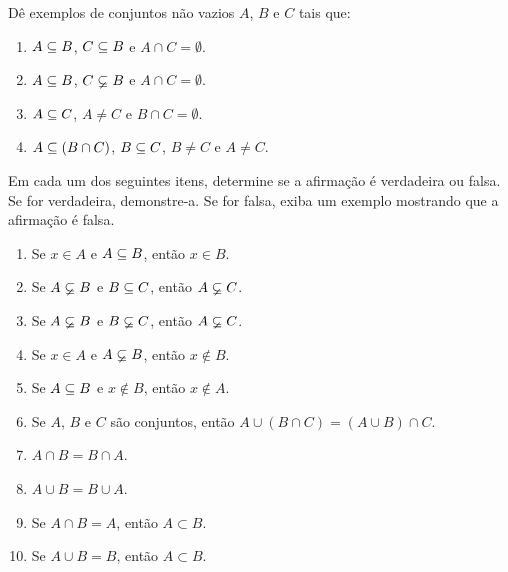 \documentclass[12pt]{exam}
\begin{document}
    \questao{} D\^e exemplos de conjuntos n\~ao vazios $A$, $B$ e $C$ tais que:
    \begin{enumerate}[label={\alph*})]
        \item $A \subseteq B$, $C \subseteq B$ e $A \cap C = \emptyset$.

        \item $A \subseteq B$, $C \varsubsetneq B$ e $A \cap C = \emptyset$.

        \item $A \subseteq C$, $A \ne C$ e $B \cap C = \emptyset$.

        \item $A \subseteq (B \cap C)$, $B \subseteq C$, $B \ne C$ e $A \ne C$.
    \end{enumerate}

    \vspace{.3cm}

    \questao{} Em cada um dos seguintes itens, determine se a afirma\c{c}\~ao \'e
    verdadeira ou falsa. Se for verdadeira, demonstre-a. Se for falsa, exiba um
    exemplo mostrando que a afirma\c{c}\~ao \'e falsa.
    \begin{enumerate}[label={\alph*})]
        \item Se $x \in A$ e $A \subseteq B$, ent\~ao $x \in B$.

        \item Se $A \varsubsetneq B$ e $B \subseteq C$, ent\~ao $A \varsubsetneq C$.

        \item Se $A \varsubsetneq B$ e $B \varsubsetneq C$, ent\~ao $A \varsubsetneq C$.

        \item Se $x \in A$ e $A \varsubsetneq B$, ent\~ao $x \notin B$.

        \item Se $A \subseteq B$ e $x \notin B$, ent\~ao $x \notin A$.

        \item Se $A$, $B$ e $C$ s\~ao conjuntos, ent\~ao $A \cup (B \cap C) = (A \cup B) \cap C$.

        \item $A \cap B = B \cap A$.

        \item $A \cup B = B \cup A$.

        \item Se $A \cap B = A$, então $A \subset B$.

        \item Se $A \cup B = B$, então $A \subset B$.
    \end{enumerate}
\end{document}
